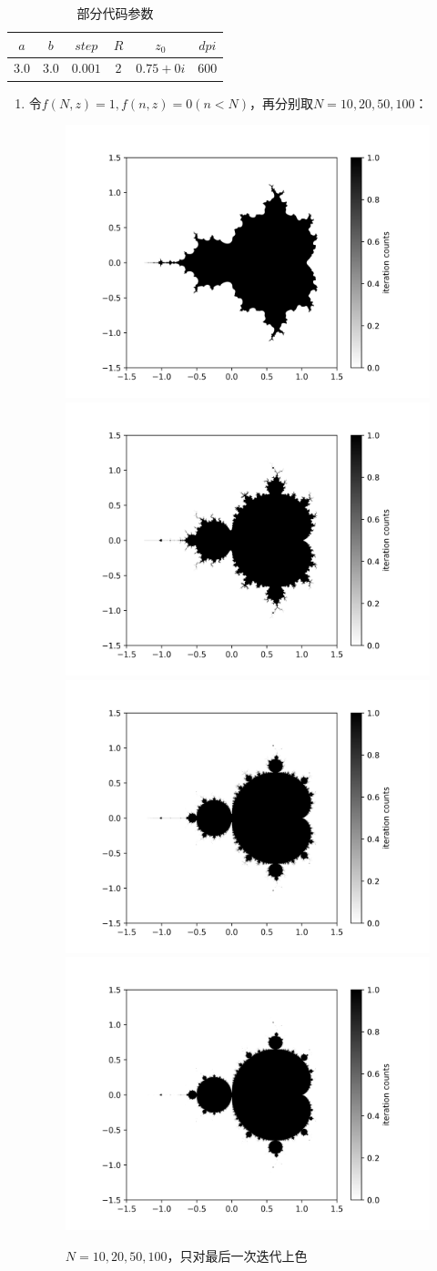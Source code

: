\documentclass[a4paper]{ctexart}
\begin{document}
\begin{table}[htbp]
\caption{部分代码参数}
\centering
\begin{tabular}{|c|c|c|c|c|c|}
	\hline
	$a$ & $b$ & $step$ & $R$ & $z_0$ & $dpi$ \\
	\hline
	$3.0$ & $3.0$ & $0.001$ & $2$ & $0.75+0i$ & $600$ \\
	\hline 
\end{tabular}
\end{table}
\begin{enumerate}
	\item 令$f(N,z)=1,f(n,z)=0(n<N)$，再分别取$N=10,20,50,100$：
	\begin{figure}[htbp]
		\centering
		\includegraphics[width=.45\textwidth]{./png/man_normal_n10.png}
		\includegraphics[width=.45\textwidth]{./png/man_normal_n20.png}
		\includegraphics[width=.45\textwidth]{./png/man_normal_n50.png}
		\includegraphics[width=.45\textwidth]{./png/man_normal_n100.png}
		\caption{$N=10,20,50,100$，只对最后一次迭代上色}
		\label{normal}
	\end{figure}


\end{enumerate}
\end{document}

